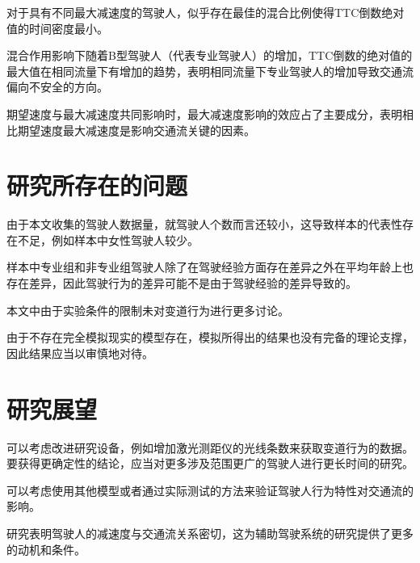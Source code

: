 对于具有不同最大减速度的驾驶人，似乎存在最佳的混合比例使得TTC倒数绝对值的时间密度最小。

混合作用影响下随着B型驾驶人（代表专业驾驶人）的增加，TTC倒数的绝对值的最大值在相同流量下有增加的趋势，表明相同流量下专业驾驶人的增加导致交通流偏向不安全的方向。

期望速度与最大减速度共同影响时，最大减速度影响的效应占了主要成分，表明相比期望速度最大减速度是影响交通流关键的因素。


\section{研究所存在的问题}

由于本文收集的驾驶人数据量，就驾驶人个数而言还较小，这导致样本的代表性存在不足，例如样本中女性驾驶人较少。

样本中专业组和非专业组驾驶人除了在驾驶经验方面存在差异之外在平均年龄上也存在差异，因此驾驶行为的差异可能不是由于驾驶经验的差异导致的。

本文中由于实验条件的限制未对变道行为进行更多讨论。

由于不存在完全模拟现实的模型存在，模拟所得出的结果也没有完备的理论支撑，因此结果应当以审慎地对待。



\section{研究展望}

可以考虑改进研究设备，例如增加激光测距仪的光线条数来获取变道行为的数据。要获得更确定性的结论，应当对更多涉及范围更广的驾驶人进行更长时间的研究。

可以考虑使用其他模型或者通过实际测试的方法来验证驾驶人行为特性对交通流的影响。

研究表明驾驶人的减速度与交通流关系密切，这为辅助驾驶系统的研究提供了更多的动机和条件。


